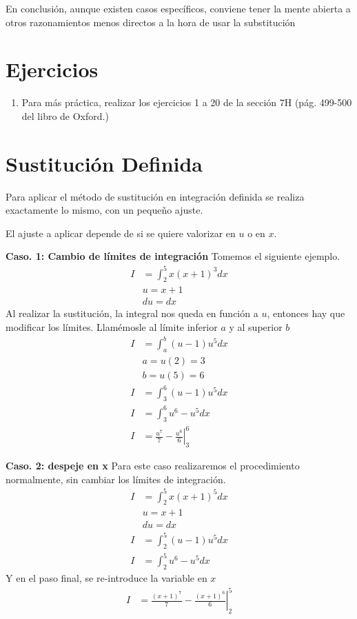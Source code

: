 \documentclass[spanish,12pt]{article}
\newcommand*\Eval[3]{\left.#1\right\rvert_{#2}^{#3}}
\begin{document}
En conclusión, aunque existen casos específicos, conviene tener la mente abierta a otros razonamientos menos directos a la hora de usar la substitución

\section{Ejercicios}
\begin{enumerate}[1)]
    \item Para más práctica, realizar los ejercicios 1 a 20 de la sección 7H (pág. 499-500 del libro de Oxford.)
\end{enumerate}
\section{Sustitución Definida}
Para aplicar el método de sustitución en integración definida se realiza exactamente lo mismo, con un pequeño ajuste.

El ajuste a aplicar depende de si se quiere valorizar en $u$ o en $x$.

\textbf{Caso. 1: Cambio de límites de integración}
Tomemos el siguiente ejemplo.
\begin{align*}
    I&=\int_2^5x(x+1)^3dx\\
    &u=x+1\\
    &du=dx
\end{align*}
Al realizar la sustitución, la integral nos queda en función a $u$, entonces hay que modificar los límites. Llamémosle al límite inferior $a$ y al superior $b$
\begin{align*}
    I&=\int_a^b(u-1)u^5dx\\
    &a=u(2)=3\\
    &b=u(5)=6\\
    I&=\int_3^6(u-1)u^5dx\\
    I&=\int_3^6u^6-u^5dx\\
    I&=\Eval{\frac{u^7}{7}-\frac{u^6}{6}}{3}{6}
\end{align*}

\textbf{Caso. 2: despeje en x}
Para este caso realizaremos el procedimiento normalmente, sin cambiar los límites de integración. 
\begin{align*}
    I&=\int_2^5x(x+1)^5dx\\
    &u=x+1\\
    &du=dx\\
    I&=\int_2^5(u-1)u^5dx\\
    I&=\int_2^5u^6-u^5dx
\end{align*}
Y en el paso final, se re-introduce la variable en $x$
\begin{align*}
    I&=\Eval{\frac{(x+1)^7}{7}-\frac{(x+1)^6}{6}}{2}{5}
\end{align*}
\end{document}
